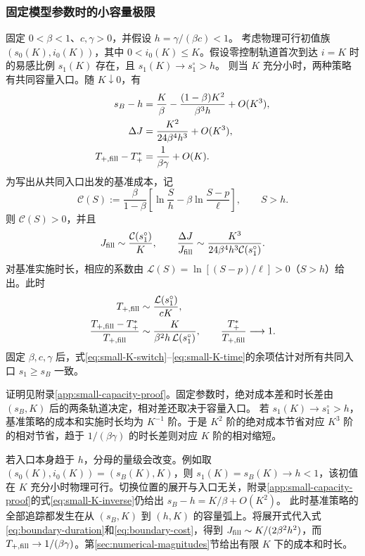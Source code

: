 \documentclass[lang=cn,a4paper,newtx]{elegantpaper}
\theoremstyle{plain}
\theoremstyle{definition}
\begin{document}
\subsubsection{固定模型参数时的小容量极限}
\begin{proposition}[小容量下的成本差与时长差]
\label{prop:small-capacity}
固定 $0<\beta<1$、$c,\gamma>0$，并假设 $h=\gamma/(\beta c)<1$。
考虑物理可行初值族 $(s_0(K),i_0(K))$，其中 $0<i_0(K)\le K$。假设零控制轨道首次到达 $i=K$ 时的易感比例 $s_1(K)$ 存在，且 $s_1(K)\to s_1^\circ>h$。
则当 $K$ 充分小时，两种策略有共同容量入口。随 $K\downarrow0$，有
\begin{align}
 s_B-h&=\frac K\beta-\frac{(1-\beta)K^2}{\beta^3h}+O(K^3),
 \label{eq:small-K-switch}\\
 \Delta J&=\frac{K^2}{24\beta^4h^3}+O(K^3),
 \label{eq:small-K-cost}\\
 T_{+,\rm fill}-T_+^*&=\frac1{\beta\gamma}+O(K).
 \label{eq:small-K-time}
\end{align}
为写出从共同入口出发的基准成本，记
\begin{equation}
 \mathcal C(S):=\frac\beta{1-\beta}
 \left[\ln\frac Sh-\beta\ln\frac{S-p}{\ell}\right],\qquad S>h.
 \label{eq:small-K-C}
\end{equation}
则 $\mathcal C(S)>0$，并且
\begin{equation}
 J_{\rm fill}\sim\frac{\mathcal C(s_1^\circ)}K,\qquad
 \frac{\Delta J}{J_{\rm fill}}
 \sim\frac{K^3}{24\beta^4h^3\mathcal C(s_1^\circ)}.
 \label{eq:small-K-relative}
\end{equation}
对基准实施时长，相应的系数由 $\mathcal L(S)=\ln[(S-p)/\ell]>0$（$S>h$）给出。此时
\begin{align}
 T_{+,\rm fill}&\sim\frac{\mathcal L(s_1^\circ)}{cK},\notag\\
 \frac{T_{+,\rm fill}-T_+^*}{T_{+,\rm fill}}
 &\sim\frac{K}{\beta^2h\,\mathcal L(s_1^\circ)},\qquad
 \frac{T_+^*}{T_{+,\rm fill}}\longrightarrow1.
 \label{eq:small-K-relative-time}
\end{align}
固定 $\beta,c,\gamma$ 后，式\eqref{eq:small-K-switch}--\eqref{eq:small-K-time}的余项估计对所有共同入口 $s_1\ge s_B$ 一致。
\end{proposition}
证明见附录\ref{app:small-capacity-proof}。固定参数时，绝对成本差和时长差由 $(s_B,K)$ 后的两条轨道决定，相对差还取决于容量入口。
若 $s_1(K)\to s_1^\circ>h$，基准策略的成本和实施时长均为 $K^{-1}$ 阶。于是 $K^2$ 阶的绝对成本节省对应 $K^3$ 阶的相对节省，趋于 $1/(\beta\gamma)$ 的时长差则对应 $K$ 阶的相对缩短。

若入口本身趋于 $h$，分母的量级会改变。例如取 $(s_0(K),i_0(K))=(s_B(K),K)$，则 $s_1(K)=s_B(K)\to h<1$，该初值在 $K$ 充分小时物理可行。切换位置的展开与入口无关，附录\ref{app:small-capacity-proof}的式\eqref{eq:small-K-inverse}仍给出 $s_B-h=K/\beta+O(K^2)$。
此时基准策略的全部追踪都发生在从 $(s_B,K)$ 到 $(h,K)$ 的容量弧上。将展开式代入式\eqref{eq:boundary-duration}和\eqref{eq:boundary-cost}，得到 $J_{\rm fill}\sim K/(2\beta^2h^2)$，而 $T_{+,\rm fill}\to1/(\beta\gamma)$。第\ref{sec:numerical-magnitudes}节给出有限 $K$ 下的成本和时长。
\end{document}
